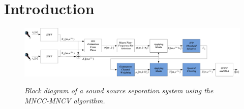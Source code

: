 \documentclass{article}
\begin{document}
\section{Introduction}
%
\begin{figure}[t]
            \begin{center}
                    {\includegraphics[width=170mm]{../figures/PDCW_AUTO_BlockDiagram}}
            \end{center}
 \caption{\label{fig:PDCW_AUTO_BlockDiagram}
       \emph{ Block diagram of a sound source separation system using the
       MNCC-MNCV algorithm. }
       }	\vspace{-6mm}
\end{figure}
%
\label{sec:intro}
%
%
%
%
\end{document}
